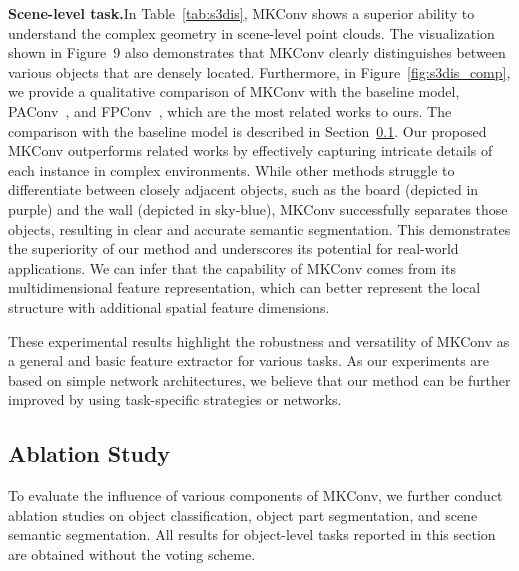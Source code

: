 \documentclass[preprint,12pt]{elsarticle}
\begin{document}
\medskip
\noindent\textbf{Scene-level task.}\hspace{0.3cm}In Table~\ref{tab:s3dis}, MKConv shows a superior ability to understand the complex geometry in scene-level point clouds. The visualization shown in Figure~9 also demonstrates that MKConv clearly distinguishes between various objects that are densely located. Furthermore, in Figure~\ref{fig:s3dis_comp}, we provide a qualitative comparison of MKConv with the baseline model, PAConv~\cite{xu2021paconv}, and FPConv~\cite{lin2020fpconv}, which are the most related works to ours. The comparison with the baseline model is described in Section~\ref{sec:ablation}. Our proposed MKConv outperforms related works by effectively capturing intricate details of each instance in complex environments. While other methods struggle to differentiate between closely adjacent objects, such as the board (depicted in purple) and the wall (depicted in sky-blue), MKConv successfully separates those objects, resulting in clear and accurate semantic segmentation. This demonstrates the superiority of our method and underscores its potential for real-world applications. We can infer that the capability of MKConv comes from its multidimensional feature representation, which can better represent the local structure with additional spatial feature dimensions.

These experimental results highlight the robustness and versatility of MKConv as a general and basic feature extractor for various tasks. As our experiments are based on simple network architectures, we believe that our method can be further improved by using task-specific strategies or networks.



\subsection{Ablation Study}
\label{sec:ablation}

To evaluate the influence of various components of MKConv, we further conduct ablation studies on object classification, object part segmentation, and scene semantic segmentation. All results for object-level tasks reported in this section are obtained without the voting scheme.
\end{document}
